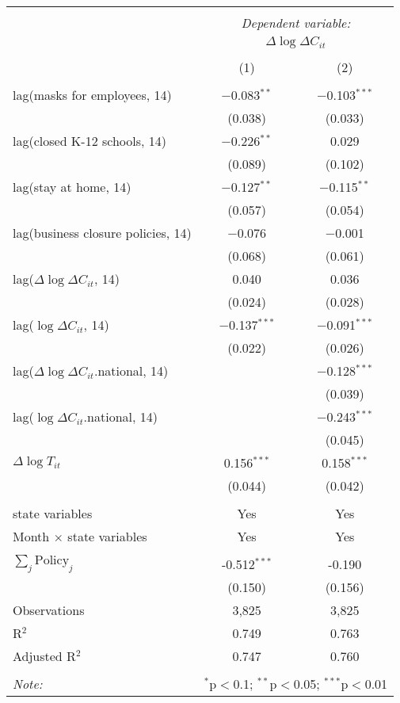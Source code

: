 \begin{tabular}{@{\extracolsep{1pt}}lcc} 
\\[-1.8ex]\hline 
\hline \\[-1.8ex] 
 & \multicolumn{2}{c}{\textit{Dependent variable:}} \\ 
\cline{2-3} 
 & \multicolumn{2}{c}{$\Delta \log \Delta C_{it}$} \\ 
\\[-1.8ex] & (1) & (2)\\ 
\hline \\[-1.8ex] 
 lag(masks for employees, 14) & $-$0.083$^{**}$ & $-$0.103$^{***}$ \\ 
  & (0.038) & (0.033) \\ 
  lag(closed K-12 schools, 14) & $-$0.226$^{**}$ & 0.029 \\ 
  & (0.089) & (0.102) \\ 
  lag(stay at home, 14) & $-$0.127$^{**}$ & $-$0.115$^{**}$ \\ 
  & (0.057) & (0.054) \\ 
  lag(business closure policies, 14) & $-$0.076 & $-$0.001 \\ 
  & (0.068) & (0.061) \\ 
  lag($\Delta \log \Delta C_{it}$, 14) & 0.040 & 0.036 \\ 
  & (0.024) & (0.028) \\ 
  lag($\log \Delta C_{it}$, 14) & $-$0.137$^{***}$ & $-$0.091$^{***}$ \\ 
  & (0.022) & (0.026) \\ 
  lag($\Delta \log \Delta C_{it}$.national, 14) &  & $-$0.128$^{***}$ \\ 
  &  & (0.039) \\ 
  lag($\log \Delta C_{it}$.national, 14) &  & $-$0.243$^{***}$ \\ 
  &  & (0.045) \\ 
  $\Delta \log T_{it}$ & 0.156$^{***}$ & 0.158$^{***}$ \\ 
  & (0.044) & (0.042) \\ 
 \hline \\[-1.8ex] 
state variables & Yes & Yes \\ 
Month $\times$ state variables & Yes & Yes \\ 
\hline \\[-1.8ex] 
$\sum_j \mathrm{Policy}_j$ & -0.512$^{***}$ & -0.190 \\ 
 & (0.150) & (0.156) \\ 
Observations & 3,825 & 3,825 \\ 
R$^{2}$ & 0.749 & 0.763 \\ 
Adjusted R$^{2}$ & 0.747 & 0.760 \\ 
\hline 
\hline \\[-1.8ex] 
\textit{Note:}  & \multicolumn{2}{r}{$^{*}$p$<$0.1; $^{**}$p$<$0.05; $^{***}$p$<$0.01} \\ 
\end{tabular} 